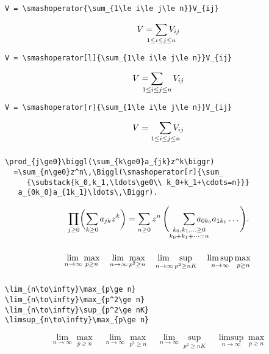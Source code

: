 \documentclass{beamer}
\begin{document}
\begin{frame}[fragile,t]
\frametitle{\texttt{\string\smashoperator}}
\begin{verbatim}
V = \smashoperator{\sum_{1\le i\le j\le n}}V_{ij}
\end{verbatim}
\[V = \smashoperator{\sum_{1\le i\le j\le n}}V_{ij}\]
\smallskip
\begin{verbatim}
V = \smashoperator[l]{\sum_{1\le i\le j\le n}}V_{ij}
\end{verbatim}
\[V = \smashoperator[l]{\sum_{1\le i\le j\le n}}V_{ij}\]
\smallskip
\begin{verbatim}
V = \smashoperator[r]{\sum_{1\le i\le j\le n}}V_{ij}
\end{verbatim}
\[V = \smashoperator[r]{\sum_{1\le i\le j\le n}}V_{ij}\]
\end{frame}

\begin{frame}[fragile,t]
\frametitle{\texttt{\string\smashoperator}}
\begin{verbatim}
\prod_{j\ge0}\biggl(\sum_{k\ge0}a_{jk}z^k\biggr)
  =\sum_{n\ge0}z^n\,\Biggl(\smashoperator[r]{\sum_
     {\substack{k_0,k_1,\ldots\ge0\\ k_0+k_1+\cdots=n}}}
   a_{0k_0}a_{1k_1}\ldots\,\Biggr).
\end{verbatim}
\medskip
\[
\prod_{j\ge0}\biggl(\sum_{k\ge0}a_{jk}z^k\biggr)
  =\sum_{n\ge0}z^n\,\Biggl(\smashoperator[r]{\sum_
       {\substack{k_0,k_1,\ldots\ge0\\ k_0+k_1+\cdots=n}}}
    a_{0k_0}a_{1k_1}\ldots\,\Biggr).
\]    
\end{frame}

\begin{frame}
\frametitle{\texttt{\string\adjustlimits}}
\Large
\[
\adjustlimits\lim_{n\to\infty} \max_{p\ge n} \quad
\adjustlimits\lim_{n\to\infty} \max_{p^2\ge n} \quad
\adjustlimits\lim_{n\to\infty} \sup_{p^2\ge nK} \quad
\adjustlimits\limsup_{n\to\infty} \max_{p\ge n}
\]
\end{frame}

\begin{frame}[fragile,t]
\frametitle{\texttt{\string\adjustlimits}}
\begin{verbatim}
\lim_{n\to\infty}\max_{p\ge n}
\lim_{n\to\infty}\max_{p^2\ge n} 
\lim_{n\to\infty}\sup_{p^2\ge nK} 
\limsup_{n\to\infty}\max_{p\ge n}
\end{verbatim}
\smallskip
{\Large
\[
\lim_{n\to\infty}\max_{p\ge n} \quad
\lim_{n\to\infty}\max_{p^2\ge n} \quad
\lim_{n\to\infty}\sup_{p^2\ge nK} \quad
\limsup_{n\to\infty}\max_{p\ge n}
\]
}
\end{frame}
\end{document}
